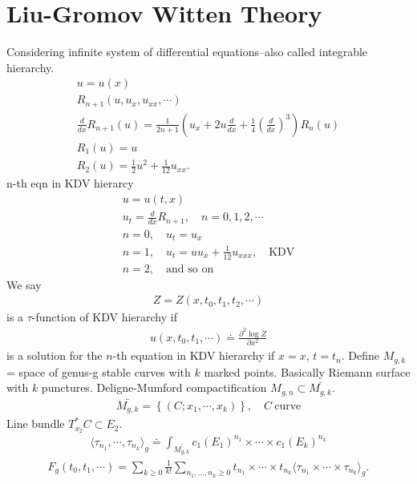 \documentclass[12pt,reqno]{amsart}
\numberwithin{equation}{section}  %
\newcommand{\p}{\partial}
\begin{document}
\section{Liu-Gromov Witten Theory} 
\label{sec:liu}
Considering infinite system of differential equations--also called integrable
hierarchy. 
\begin{gather*}
    u = u(x)
    \\
    R_{n+1}(u, u_{x}, u_{xx}, \cdots)
    \\
    \frac{d}{dx} R_{n+1}(u) = \frac{1}{2n+1} \left( u_{x} + 2u \frac{d}{dx} +
	\frac{1}{4}\left( \frac{d}{dx} \right)^{3} \right) R_{n}(u)
    \\
    R_{1}(u) = u
    \\
    R_{2}(u) = \frac{1}{2} u^{2} + \frac{1}{12} u_{xx}.
\end{gather*}
n-th eqn in KDV hierarcy
%
%
\begin{gather*}
    u = u(t,x)
    \\
    u_{t} =  \frac{d}{dx}R_{n+1}, \quad n = 0,1,2,\cdots
    \\
    n = 0, \quad u_{t} = u_{x}
    \\
    n=1, \quad u_{t} = uu_{x} + \frac{1}{12}u_{xxx}, \quad \text{KDV}
    \\
    n=2, \quad \text{and so on}
\end{gather*}
We say
\begin{gather*}
    Z = Z(x, t_{0}, t_{1}, t_{2}, \cdots)
\end{gather*}
is a $\tau$-function of KDV hierarchy if
\begin{gather*}
    u(x, t_{0}, t_{1}, \cdots) \doteq \frac{\p^{2} \log Z}{\p x^{2}}
\end{gather*}
is a solution for the $n$-th equation in KDV hierarchy if $x =x$, $t =
t_{n}$. 
Define $M_{g,k}$ = space of genus-g stable curves with $k$ marked points.
Basically Riemann surface with $k$ punctures. Deligne-Mumford compactification $ M_{g,n} \subset \bar{M_{g,k}}$.
\begin{gather*}
    \bar{M_{g,k}} = \left\{ (C; x_{1}, \cdots, x_{k}) \right\}, \quad C \
    \text{curve} 
\end{gather*}
Line bundle $T_{x_{2}}^{*}C \subset E_{2}$.
\begin{gather*}
    \langle \tau_{n_{1}}, \cdots, \tau_{n_{k}} \rangle_{g} \doteq
    \int_{\bar{M_{g,k}}} c_{1}(E_{1})^{n_{1}} \times \cdots \times
    c_{1}(E_{k})^{n_{k}}
\end{gather*}
\begin{gather*}
    F_{g}(t_{0}, t_{1}, \cdots) = \sum_{k \ge 0} \frac{1}{k!} \sum_{n_{1}, \ldots,
	n_{k} \ge 0} t_{n_{1}} \times\cdots\times t_{n_{k}} \langle \tau_{n_{1}}
    \times\cdots \times \tau_{n_{k}} \rangle_{g}.
\end{gather*}
\end{document}
